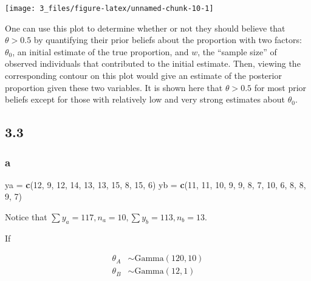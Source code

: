 \documentclass[]{article}
\newenvironment{Shaded}{\begin{snugshade}}{\end{snugshade}}
\newcommand{\DecValTok}[1]{\textcolor[rgb]{0.00,0.00,0.81}{#1}}
\newcommand{\KeywordTok}[1]{\textcolor[rgb]{0.13,0.29,0.53}{\textbf{#1}}}
\newcommand{\NormalTok}[1]{#1}
\newcommand{\StringTok}[1]{\textcolor[rgb]{0.31,0.60,0.02}{#1}}
\begin{document}
\begin{center}\texttt{[image: 3\_files/figure-latex/unnamed-chunk-10-1]} \end{center}

One can use this plot to determine whether or not they should believe
that \(\theta > 0.5\) by quantifying their prior beliefs about the
proportion with two factors: \(\theta_0\), an initial estimate of the
true proportion, and \(w\), the ``sample size'' of observed individuals
that contributed to the initial estimate. Then, viewing the
corresponding contour on this plot would give an estimate of the
posterior proportion given these two variables. It is shown here that
\(\theta > 0.5\) for most prior beliefs except for those with relatively
low and very strong estimates about \(\theta_0\).

\hypertarget{section-2}{%
\subsection{3.3}\label{section-2}}

\hypertarget{a-1}{%
\subsubsection{a}\label{a-1}}

\begin{Shaded}
\begin{Highlighting}[]
\NormalTok{ya =}\StringTok{ }\KeywordTok{c}\NormalTok{(}\DecValTok{12}\NormalTok{, }\DecValTok{9}\NormalTok{, }\DecValTok{12}\NormalTok{, }\DecValTok{14}\NormalTok{, }\DecValTok{13}\NormalTok{, }\DecValTok{13}\NormalTok{, }\DecValTok{15}\NormalTok{, }\DecValTok{8}\NormalTok{, }\DecValTok{15}\NormalTok{, }\DecValTok{6}\NormalTok{)}
\NormalTok{yb =}\StringTok{ }\KeywordTok{c}\NormalTok{(}\DecValTok{11}\NormalTok{, }\DecValTok{11}\NormalTok{, }\DecValTok{10}\NormalTok{, }\DecValTok{9}\NormalTok{, }\DecValTok{9}\NormalTok{, }\DecValTok{8}\NormalTok{, }\DecValTok{7}\NormalTok{, }\DecValTok{10}\NormalTok{, }\DecValTok{6}\NormalTok{, }\DecValTok{8}\NormalTok{, }\DecValTok{8}\NormalTok{, }\DecValTok{9}\NormalTok{, }\DecValTok{7}\NormalTok{)}
\end{Highlighting}
\end{Shaded}

Notice that \(\sum y_a = 117, n_a = 10, \sum y_b = 113, n_b = 13\).

If

\begin{align}
\theta_A &\sim \text{Gamma}(120, 10) \\
\theta_B &\sim \text{Gamma}(12, 1)
\end{align}
\end{document}
